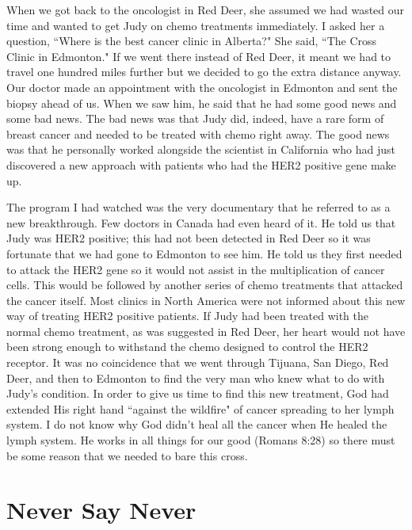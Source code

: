 \documentclass[oneside]{book}
\begin{document}
When we got back to the oncologist in Red Deer, she assumed we had wasted our time and wanted to get Judy on chemo treatments immediately. I asked her a question, ``Where is the best cancer clinic in Alberta?" She said, ``The Cross Clinic in Edmonton." If we went there instead of Red Deer, it meant we had to travel one hundred miles further but we decided to go the extra distance anyway. Our doctor made an appointment with the oncologist in Edmonton and sent the biopsy ahead of us. When we saw him, he said that he had some good news and some bad news. The bad news was that Judy did, indeed, have a rare form of breast cancer and needed to be treated with chemo right away. The good news was that he personally worked alongside the scientist in California who had just discovered a new approach with patients who had the HER2 positive gene make up.

The program I had watched was the very documentary that he referred to as a new breakthrough. Few doctors in Canada had even heard of it. He told us that Judy was HER2 positive; this had not been detected in Red Deer so it was fortunate that we had gone to Edmonton to see him. He told us they first needed to attack the HER2 gene so it would not assist in the multiplication of cancer cells. This would be followed by another series of chemo treatments that attacked the cancer itself. Most clinics in North America were not informed about this new way of treating HER2 positive patients. If Judy had been treated with the normal chemo treatment, as was suggested in Red Deer, her heart would not have been strong enough to withstand the chemo designed to control the HER2 receptor. It was no coincidence that we went through Tijuana, San Diego, Red Deer, and then to Edmonton to find the very man who knew what to do with Judy's condition. In order to give us time to find this new treatment, God had extended His right hand ``against the wildfire" of cancer spreading to her lymph system. I do not know why God didn't heal all the cancer when He healed the lymph system. He works in all things for our good (Romans 8:28) so there must be some reason that we needed to bare this cross.


\section{Never Say Never}
\
\end{document}

